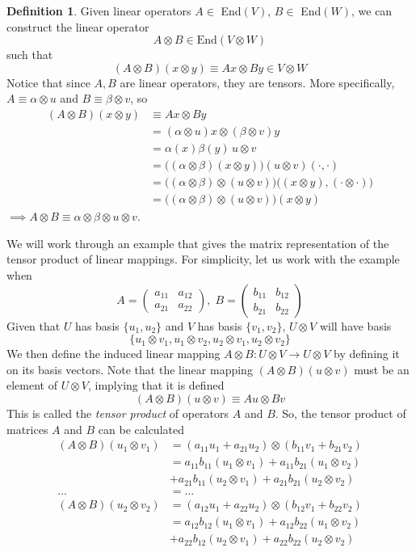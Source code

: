 \documentclass{article}
\theoremstyle{remark}
\theoremstyle{definition}
\newtheorem{definition}{Definition}[section]
\begin{document}
\begin{definition}
Given linear operators $A \in $ End$(V)$, $B \in $ End$(W)$, we can construct the linear operator 
\[A \otimes B \in \text{End}(V \otimes W)\] 
such that 
\[(A \otimes B) (x \otimes y) \equiv A x \otimes B y \in V \otimes W\]
Notice that since $A, B$ are linear operators, they are tensors. More specifically, $A \equiv \alpha \otimes u$ and $B \equiv \beta \otimes v$, so
\begin{align*}
    (A \otimes B) (x \otimes y) & \equiv A x \otimes B y \\
    & = (\alpha \otimes u) x \otimes (\beta \otimes v) y \\
    & = \alpha (x) \beta (y) \, u \otimes v \\
    & = \big((\alpha \otimes \beta)(x \otimes y)\big) (u \otimes v)(\cdot, \cdot) \\
    & = \big((\alpha \otimes \beta) \otimes (u \otimes v)\big) \big((x \otimes y), (\cdot \otimes \cdot)\big) \\
    & = \big((\alpha \otimes \beta) \otimes (u \otimes v)\big)(x \otimes y) 
\end{align*}
$\implies A \otimes B \equiv \alpha \otimes \beta \otimes u \otimes v$. 
\end{definition}
We will work through an example that gives the matrix representation of the tensor product of linear mappings. For simplicity, let us work with the example when 
\[A = \begin{pmatrix}
a_{11} & a_{12} \\ a_{21} & a_{22}
\end{pmatrix}, \; B = \begin{pmatrix}
b_{11} & b_{12} \\ b_{21} & b_{22}
\end{pmatrix}\]
Given that $U$ has basis $\{u_1, u_2\}$ and $V$ has basis $\{v_1, v_2\}$, $U \otimes V$ will have basis 
\[\{u_1 \otimes v_1, u_1 \otimes v_2, u_2 \otimes v_1, u_2 \otimes v_2\}\]
We then define the induced linear mapping $A\otimes B: U \otimes V \longrightarrow U \otimes V$ by defining it on its basis vectors. Note that the linear mapping $(A \otimes B)(u\otimes v)$ must be an element of $U \otimes V$, implying that it is defined
\[(A \otimes B)(u\otimes v) \equiv Au \otimes Bv\]
This is called the \textit{tensor product} of operators $A$ and $B$.
So, the tensor product of matrices $A$ and $B$ can be calculated
\begin{align*}
    (A \otimes B) (u_1 \otimes v_1) &= (a_{11} u_1 + a_{21} u_2) \otimes (b_{11} v_1 + b_{21} v_2) \\
    & = a_{11} b_{11} (u_1 \otimes v_1) + a_{11} b_{21} (u_1 \otimes v_2) \\
    & + a_{21} b_{11} (u_2 \otimes v_1) + a_{21} b_{21} (u_2 \otimes v_2) \\
    ... & = ... \\
    (A \otimes B) (u_2 \otimes v_2) & = (a_{12} u_1 + a_{22} u_2) \otimes (b_{12} v_1 + b_{22} v_2) \\
    & = a_{12} b_{12} (u_1 \otimes v_1) + a_{12} b_{22} (u_1 \otimes v_2) \\
    & + a_{22} b_{12} (u_2 \otimes v_1) + a_{22} b_{22} (u_2 \otimes v_2) 
\end{align*}
\end{document}
